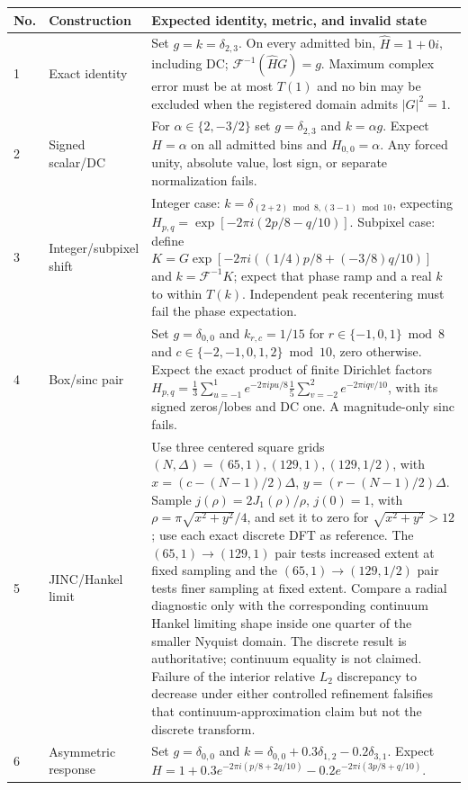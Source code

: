 \documentclass[11pt]{article}
\newcommand{\IFFT}{\mathcal{F}^{-1}}
\begin{document}
\begin{longtable}{@{}L{0.05\textwidth}L{0.24\textwidth}L{0.62\textwidth}@{}}
\toprule
No. & Construction & Expected identity, metric, and invalid state \\
\midrule
{} & Exact identity & Set $g=k=\delta_{2,3}$.  On every admitted bin,
$\widehat H=1+0i$, including DC; $\IFFT(\widehat H G)=g$.  Maximum complex error
must be at most $T(1)$ and no bin may be excluded when the registered domain
admits $|G|^2=1$. \\
2 & Signed scalar/DC & For $\alpha\in\{2,-3/2\}$ set $g=\delta_{2,3}$ and
$k=\alpha g$.  Expect $H=\alpha$ on all admitted bins and
$H_{0,0}=\alpha$.  Any forced unity, absolute value, lost sign, or separate
normalization fails. \\
3 & Integer/subpixel shift & Integer case:
$k=\delta_{(2+2)\bmod8,(3-1)\bmod10}$, expecting
$H_{p,q}=\exp[-2\pi i(2p/8-q/10)]$.  Subpixel case: define
$K=G\exp[-2\pi i((1/4)p/8+(-3/8)q/10)]$ and $k=\IFFT K$; expect that phase ramp
and a real $k$ to within $T(k)$.  Independent peak recentering must fail the
phase expectation. \\
4 & Box/sinc pair & Set $g=\delta_{0,0}$ and
$k_{r,c}=1/15$ for $r\in\{-1,0,1\}\bmod8$ and
$c\in\{-2,-1,0,1,2\}\bmod10$, zero otherwise.  Expect the exact product of
finite Dirichlet factors
$H_{p,q}=\frac{1}{3}\sum_{u=-1}^{1}e^{-2\pi ipu/8}
\frac{1}{5}\sum_{v=-2}^{2}e^{-2\pi iqv/10}$, with its signed zeros/lobes and
DC one.  A magnitude-only sinc fails. \\
5 & JINC/Hankel limit & Use three centered square grids
$(N,\Delta)=(65,1),(129,1),(129,1/2)$, with
$x=(c-(N-1)/2)\Delta$, $y=(r-(N-1)/2)\Delta$.  Sample
$j(\rho)=2J_1(\rho)/\rho$, $j(0)=1$, with
$\rho=\pi\sqrt{x^2+y^2}/4$, and set it to zero for
$\sqrt{x^2+y^2}>12$; use each exact discrete DFT as reference.  The
$(65,1)\rightarrow(129,1)$ pair tests increased extent at fixed sampling and
the $(65,1)\rightarrow(129,1/2)$ pair tests finer sampling at fixed extent.
Compare a radial diagnostic only with the corresponding continuum Hankel
limiting shape inside one quarter of the smaller Nyquist domain.  The discrete
result is authoritative; continuum equality is not claimed.  Failure of the
interior relative $L_2$ discrepancy to decrease under either controlled
refinement falsifies that continuum-approximation claim but not the discrete
transform. \\
6 & Asymmetric response & Set $g=\delta_{0,0}$ and
$k=\delta_{0,0}+0.3\delta_{1,2}-0.2\delta_{3,1}$.  Expect
$H=1+0.3e^{-2\pi i(p/8+2q/10)}-0.2e^{-2\pi i(3p/8+q/10)}$.

\end{longtable}
\end{document}
